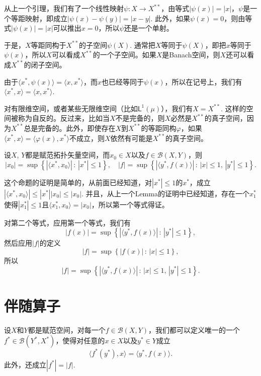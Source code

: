 \begin{para}
从上一个引理，我们有了一个线性映射$\psi:X\to X^{**}$，由等式$|\psi(x)|=|x|$，$\psi$是一个等距映射，即成立$|\psi(x)-\psi(y)|=|x-y|$. 此外，如果$\psi(x)=0$，则由等式$|\psi(x)|=|x|$可以推出$x=0$，所以$\psi$还是一个单射。

于是，$X$等距同构于$X^{**}$的子空间$\psi(X)$. 通常把$X$等同于$\psi(X)$，即把$x$等同于$\psi(x)$，所以$X$可以看成$X^{**}$的一个子空间。如果$X$是Banach空间，则$X$还可以看成$X^{**}$的闭子空间。

由于$\langle x^*,\psi(x)\rangle=\langle x,x^*\rangle$，而$x$也已经等同于$\psi(x)$，所以在记号上，我们有$\langle x^*,x\rangle=\langle x,x^*\rangle$. 

对有限维空间，或者某些无限维空间（比如$\mathsf{L}^1(\mu)$），我们有$X=X^{**}$. 这样的空间被称为自反的。反过来，比如当$X$不是完备的，则$X$必然是$X^{**}$的真子空间，因为$X^{**}$总是完备的。此外，即使存在$X$到$X^{**}$的等距同构$\varphi$，如果$\langle x^*,x\rangle=\langle \varphi(x),x^*\rangle$不成立，则$X$依然有可能是$X^{**}$的真子空间。
\end{para}

\begin{pro}
设$X$, $Y$都是赋范拓扑矢量空间，而$x_0\in X$以及$f\in \mathcal{B}(X,Y)$，则
\[
	|x_0|=\sup\left\{|\langle x^*,x_0\rangle|\,:\, |x^*|\leq 1\right\},\quad
	|f|=\sup \left\{|\langle y^*,f(x)\rangle |\,:\, |x|\leq 1,\, |y^*|\leq 1\right\}.
\]
\end{pro}

这个命题的证明是简单的，从前面已经知道，对$|x^*|\leq 1$的$x^*$，成立$|\langle x^*,x_0\rangle|\leq |x^*||x_0|\leq |x_0|$. 并且，从上一个Lemma的证明中已经知道，存在一个$x_1^*$使得$|x_1^*|\leq 1$且$\langle x_1^*,x_0\rangle=|x_0|$，所以第一个等式得证。

对第二个等式，应用第一个等式，我们有
\[
	|f(x)|=\sup\left\{|\langle y^*,f(x)\rangle|\,:\, |y^*|\leq 1\right\},
\]
然后应用$|f|$的定义
\[
	|f|=\sup\left\{|f(x)|\,:\, |x|\leq 1\right\},
\]
所以
\[
	|f|=\sup \left\{|\langle y^*,f(x)\rangle |\,:\, |x|\leq 1,\, |y^*|\leq 1\right\}.
\]

\section{伴随算子}

\begin{thm}
设$X$和$Y$都是赋范空间，对每一个$f\in \mathcal{B}(X,Y)$，我们都可以定义唯一的一个$f^*\in \mathcal{B}(Y^*,X^*)$，使得对任意的$x\in X$以及$y^*\in Y$成立
\[
	\langle f^*(y^*),x\rangle=\langle y^*,f(x)\rangle.
\]
此外，还成立$|f^*|=|f|$.
\end{thm}

